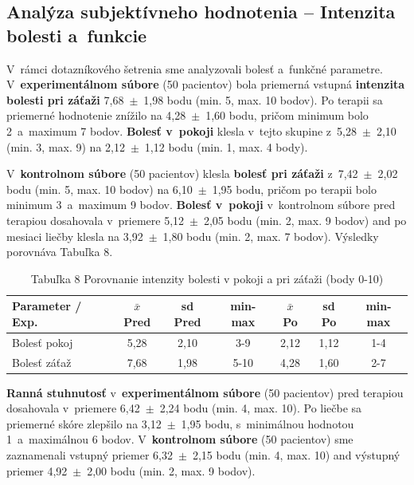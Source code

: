 \subsection{Analýza subjektívneho hodnotenia -- Intenzita bolesti a~funkcie}

V~rámci dotazníkového šetrenia sme analyzovali bolesť a~funkčné parametre. V~\textbf{experimentálnom súbore} (50 pacientov) bola priemerná vstupná \textbf{intenzita bolesti pri záťaži} 7,68~$\pm$~1,98 bodu (min. 5, max. 10 bodov). Po terapii sa priemerné hodnotenie znížilo na 4,28~$\pm$~1,60 bodu, pričom minimum bolo 2~a~maximum 7 bodov. \textbf{Bolesť v~pokoji} klesla v~tejto skupine z~5,28~$\pm$~2,10 (min. 3, max. 9) na 2,12~$\pm$~1,12 bodu (min. 1, max. 4 body).

V~\textbf{kontrolnom súbore} (50 pacientov) klesla \textbf{bolesť pri záťaži} z~7,42~$\pm$~2,02 bodu (min. 5, max. 10 bodov) na 6,10~$\pm$~1,95 bodu, pričom po terapii bolo minimum 3~a~maximum 9 bodov. \textbf{Bolesť v~pokoji} v~kontrolnom súbore pred terapiou dosahovala v~priemere 5,12~$\pm$~2,05 bodu (min. 2, max. 9 bodov) and po mesiaci liečby klesla na 3,92~$\pm$~1,80 bodu (min. 2, max. 7 bodov). Výsledky porovnáva Tabuľka 8.

\begin{table}[H]
\centering
\caption*{Tabuľka 8 Porovnanie intenzity bolesti v pokoji a pri záťaži (body 0-10)}
\begin{tabular}{|l|c|c|c|c|c|c|}
\hline
\textbf{Parameter / Exp.} & \textbf{$\bar{x}$ Pred} & \textbf{sd Pred} & \textbf{min-max} & \textbf{$\bar{x}$ Po} & \textbf{sd Po} & \textbf{min-max} \\ \hline
Bolesť pokoj & 5,28 & 2,10 & 3-9 & 2,12 & 1,12 & 1-4 \\ \hline
Bolesť záťaž & 7,68 & 1,98 & 5-10 & 4,28 & 1,60 & 2-7 \\ \hline
\end{tabular}
\end{table}

\textbf{Ranná stuhnutosť} v~\textbf{experimentálnom súbore} (50 pacientov) pred terapiou dosahovala v~priemere 6,42~$\pm$~2,24 bodu (min. 4, max. 10). Po liečbe sa priemerné skóre zlepšilo na 3,12~$\pm$~1,95 bodu, s~minimálnou hodnotou 1~a~maximálnou 6 bodov. V~\textbf{kontrolnom súbore} (50 pacientov) sme zaznamenali vstupný priemer 6,32~$\pm$~2,15 bodu (min. 4, max. 10) and výstupný priemer 4,92~$\pm$~2,00 bodu (min. 2, max. 9 bodov).

